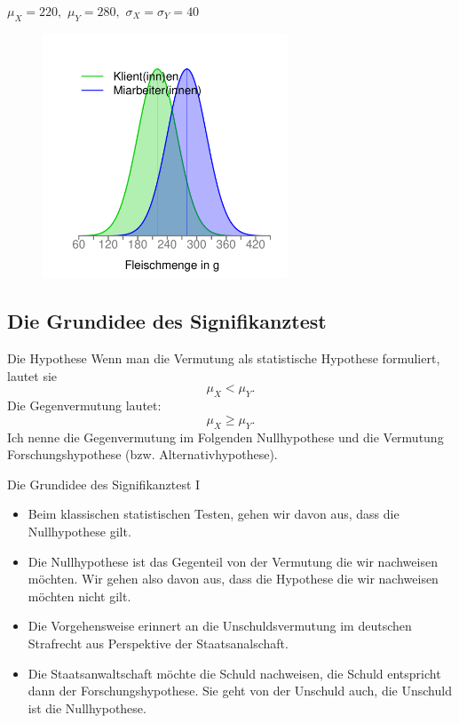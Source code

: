 \documentclass[usenames,dvipsnames,handout]{beamer}
\begin{document}
\begin{frame}{$\mu_{X}=220,$ $\mu_{Y}=280,$ $\sigma_{X}=\sigma_{Y}=40$}
  \begin{figure}[ht]
 	\centering
 	      \includegraphics[width=0.65\textwidth]{mx220my280sd40.pdf}
 	\end{figure}
\end{frame}
\subsection{Die Grundidee des Signifikanztest}
\begin{frame}{Die Hypothese}
Wenn man die Vermutung als statistische Hypothese formuliert, lautet sie
$$
\mu_{X} < \mu_{Y}.
$$
Die Gegenvermutung lautet:
$$
\mu_{X} \geq \mu_{Y}.
$$
Ich nenne die Gegenvermutung im Folgenden Nullhypothese und die Vermutung Forschungshypothese (bzw. Alternativhypothese).

\end{frame}

\begin{frame}{Die Grundidee des Signifikanztest I}
\begin{itemize}
\item{Beim klassischen statistischen Testen, gehen wir davon aus, dass die Nullhypothese gilt.}\pause
\item{Die Nullhypothese ist das Gegenteil von der Vermutung die wir nachweisen möchten. Wir gehen also davon aus,
dass die Hypothese die wir nachweisen möchten nicht gilt.}\pause
\item{Die Vorgehensweise erinnert an die Unschuldsvermutung im deutschen Strafrecht aus Perspektive der Staatsanalschaft.}\pause
\item{Die Staatsanwaltschaft möchte die Schuld nachweisen, die Schuld entspricht dann der Forschungshypothese.
Sie geht von der Unschuld auch, die Unschuld ist die Nullhypothese.}
\end{itemize}
\end{frame}
\end{document}
